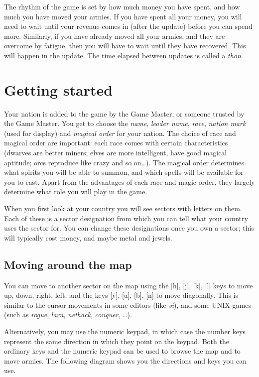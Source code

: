 The rhythm of the game is set by how much money you have spent, and
how much you have moved your armies.  If you have spent all your
money, you will need to wait until your revenue comes in (after the
update) before you can spend more.  Similarly, if you have already
moved all your armies, and they are overcome by fatigue, then you will
have to wait until they have recovered.  This will happen in the
update.  The time elapsed between updates is called a \emph{thon}.

\chapter{Getting started}

Your nation is added to the game by the Game Master, or someone
trusted by the Game Master.  You get to choose the \emph{name},
\emph{leader name}, \emph{race}, \emph{nation mark} (used for display)
and \emph{magical order} for your nation.  The choice of race and
magical order are important: each race comes with certain
characteristics (dwarves are better miners; elves are more
intelligent, have good magical aptitude; orcs reproduce like crazy and
so on\dots{}).  The magical order determines what spirits you will be
able to summon, and which spells will be available for you to cast.
Apart from the advantages of each race and magic order, they largely
determine what role you will play in the game.

When you first look at your country you will see sectors with letters on
them.  Each of these is a sector designation from which you can tell
what your country uses the sector for.  You can change these
designations once you own a sector; this will typically cost money,
and maybe metal and jewels.

\section{Moving around the map}
You can move to another sector on the map using the [h], [j], [k], [l]
keys to move up, down, right, left; and the keys [y], [u], [b], [n] to
move diagonally.  This is similar to the cursor movements in some
editors (like \emph{vi}), and some UNIX games (such as \emph{rogue},
\emph{larn}, \emph{nethack}, \emph{conquer}, \dots{}).

Alternatively, you may use the numeric keypad, in which case the
number keys represent the same direction in which they point on the
keypad.  Both the ordinary keys and the numeric keypad can be used to
browse the map and to move armies.  The following diagram shows you
the directions and keys you can use.

